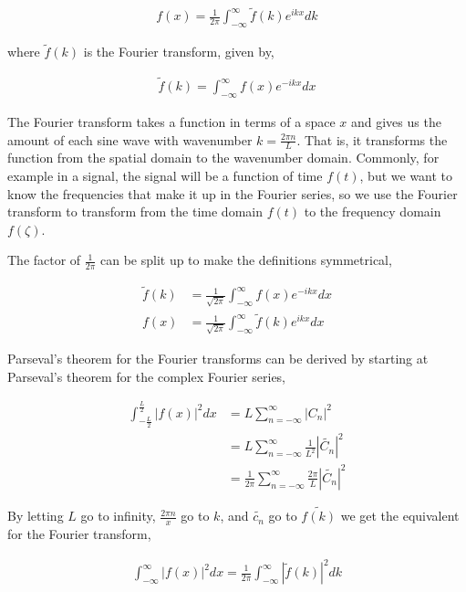 \documentclass[11pt]{amsart}
\begin{document}
\begin{align*}
  f(x) = \frac{1}{2\pi}\int_{-\infty}^{\infty}\tilde{f}(k)e^{ikx} dk
\end{align*}

where $\tilde{f}(k)$ is the Fourier transform, given by,

\begin{align*}
  \tilde{f}(k) = \int_{-\infty}^{\infty}f(x) e^{-ikx} dx
\end{align*}

The Fourier transform takes a function in terms of a space $x$ and gives us the amount of each sine wave with wavenumber $k = \frac{2\pi n}{L}$. That is, it transforms the function from the spatial domain to the wavenumber domain. Commonly, for example in a signal, the signal will be a function of time $f(t)$, but we want to know the frequencies that make it up in the Fourier series, so we use the Fourier transform to transform from the time domain $f(t)$ to the frequency domain $f(\zeta)$.

The factor of $\frac{1}{2\pi}$ can be split up to make the definitions symmetrical,

\begin{align*}
  \tilde{f}(k) &= \frac{1}{\sqrt{2\pi}}\int_{-\infty}^{\infty}f(x)e^{-ikx} dx \\
  f(x) &= \frac{1}{\sqrt{2\pi}}\int_{-\infty}^{\infty}\tilde{f}(k)e^{ikx} dx
\end{align*}

Parseval's theorem for the Fourier transforms can be derived by starting at Parseval's theorem for the complex Fourier series,

\begin{align*}
  \int_{-\frac{L}{2}}^{\frac{L}{2}}{|f(x)|}^2 dx &= L\sum\limits_{n=-\infty}^{\infty}{|C_n|}^2 \\
                                                 &= L\sum\limits_{n=-\infty}^{\infty}\frac{1}{L^2}{|\tilde{C_n}|}^2 \\
                                                 &= \frac{1}{2\pi}\sum\limits_{n=-\infty}^{\infty}\frac{2\pi}{L}{|\tilde{C_n}|}^2
\end{align*}

By letting $L$ go to infinity, $\frac{2\pi n}{x}$ go to $k$, and $\tilde{c_n}$ go to $\tilde{f(k)}$ we get the equivalent for the Fourier transform,

\begin{align*}
  \int_{-\infty}^{\infty}{|f(x)|}^2dx = \frac{1}{2\pi}\int_{-\infty}^{\infty}{|\tilde{f}(k)|}^2 dk
\end{align*}
\end{document}
